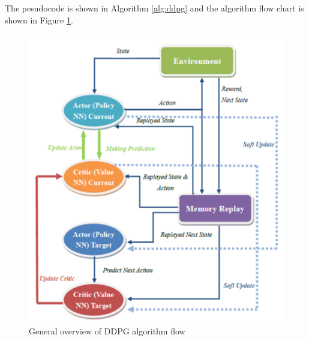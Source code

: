 \documentclass{article}
\begin{document}
The pesudocode is shown in Algorithm \ref{alg:ddpg} and the algorithm flow chart is shown in Figure \ref{fig:ddpg_flow}.
\begin{figure}[h]
	\includegraphics[width=\linewidth]{ddpg_flow.png}
	\caption{General overview of DDPG algorithm flow}
	\label{fig:ddpg_flow}
\end{figure}
\end{document}
